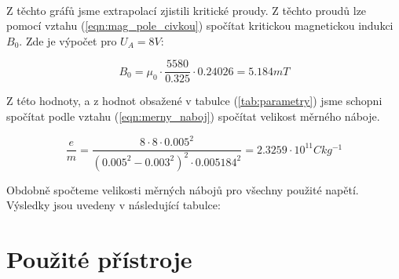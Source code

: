 \documentclass{praktikum}
\begin{document}
\paragraph{}
Z těchto gráfů jsme extrapolací zjistili kritické proudy. Z těchto proudů lze pomocí vztahu (\ref{eqn:mag_pole_civkou}) spočítat kritickou magnetickou indukci $B_0$. Zde je výpočet pro $U_A = 8V$:

\[ B_0 = \mu_0\cdot\dfrac{5580}{0.325}\cdot0.24026=5.184mT\]

Z této hodnoty, a z hodnot obsažené v tabulce (\ref{tab:parametry}) jsme schopni spočítat podle vztahu (\ref{eqn:merny_naboj}) spočítat velikost měrného náboje.

\[ \dfrac{e}{m}=\dfrac{8\cdot8\cdot0.005^2}{(0.005^2-0.003^2)^2\cdot 0.005184^2}= 2.3259 \cdot 10^{11}Ckg^{-1}\]

Obdobně spočteme velikosti měrných nábojů pro všechny použité napětí. Výsledky jsou uvedeny v následující tabulce:


\begin{table}[H]
\centering
{}
\caption{Tabulka vypočtených hodnot}
\label{tab:results}
\end{table}

\section{Použité přístroje}
\end{document}
